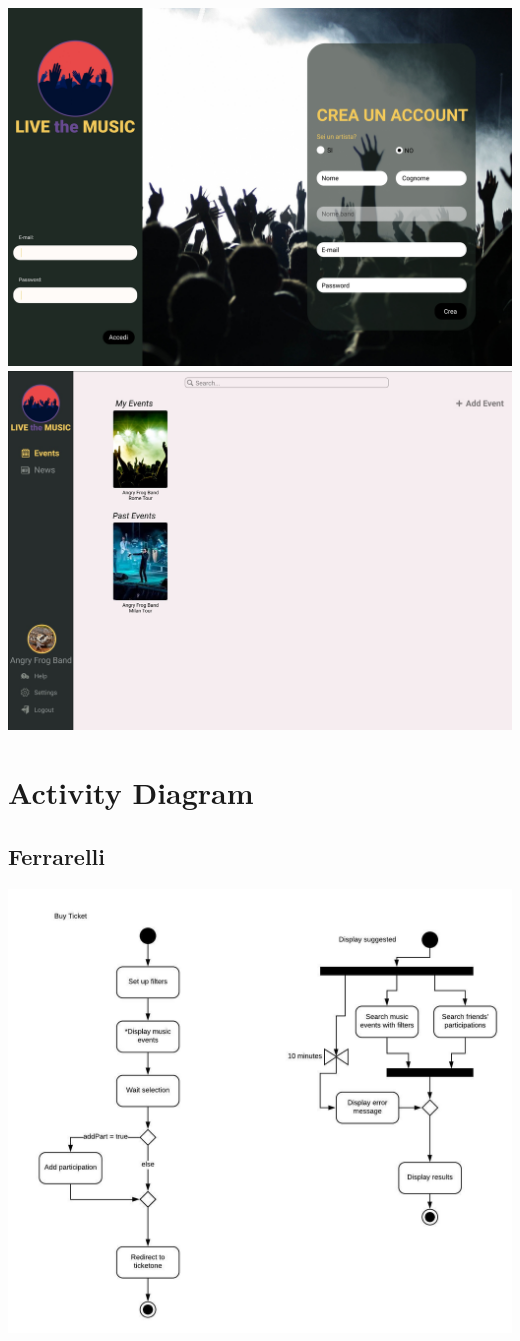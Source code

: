 \documentclass[11pt,a4paper]{article}
\begin{document}
\includegraphics[scale=0.275]{Login.jpg}
\includegraphics[scale=0.75]{AddEvent.jpg}
\section{Activity Diagram}
\subsection{Ferrarelli}
\includegraphics[scale=0.5]{hmwActivityDiagram.jpeg}
\end{document}
